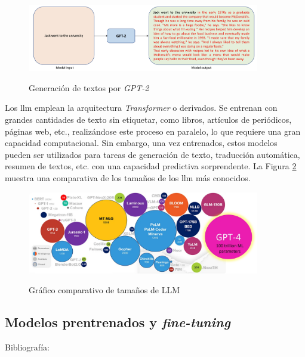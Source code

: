 \begin{figure}[H]
    \caption{Generación de textos por \textit{GPT-2}}
    \centering
    \includegraphics[width=0.9\textwidth]{./figuras/GPT2_text_generation.png}
    \label{fig:gpt2_text_generation}
\end{figure}

Los \gls{llm} emplean la arquitectura \textit{Transformer} o derivados. Se entrenan con grandes cantidades de texto sin etiquetar, como libros, artículos de periódicos, páginas web, etc., realizándose este proceso en paralelo, lo que requiere una gran capacidad computacional. Sin embargo, una vez entrenados, estos modelos pueden ser utilizados para tareas de generación de texto, traducción automática, resumen de textos, etc. con una capacidad predictiva sorprendente. La Figura \ref{fig:llm_sizes} muestra una comparativa de los tamaños de los \gls{llm} más conocidos.

\begin{figure}[H]
    \caption{Gráfico comparativo de tamaños de LLM}
    \centering
    \includegraphics[width=0.9\textwidth]{./figuras/LLMs_sizes.png}
    \label{fig:llm_sizes}
\end{figure}

\subsection{Modelos prentrenados y \textit{fine-tuning}} 
Bibliografía: \cite{chamandFinetuneYourClassifier2022}

